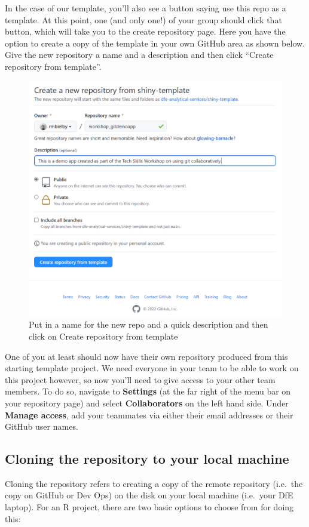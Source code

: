 \documentclass[
  12pt,
]{article}
\begin{document}
In the case of our template, you'll also see a button saying use this
repo as a template. At this point, one (and only one!) of your group
should click that button, which will take you to the create repository
page. Here you have the option to create a copy of the template in your
own GitHub area as shown below. Give the new repository a name and a
description and then click ``Create repository from template''.

\begin{figure}
\includegraphics[width=0.72\linewidth]{images/gitdemo/gitdemo-shinydash-newrepofromtemplate} \caption{Put in a name for the new repo and a quick description and then click on Create repository from template}\label{fig:unnamed-chunk-3}
\end{figure}

One of you at least should now have their own repository produced from
this starting template project. We need everyone in your team to be able
to work on this project however, so now you'll need to give access to
your other team members. To do so, navigate to \textbf{Settings} (at the
far right of the menu bar on your repository page) and select
\textbf{Collaborators} on the left hand side. Under \textbf{Manage
access}, add your teammates via either their email addresses or their
GitHub user names.

\hypertarget{cloning-the-repository-to-your-local-machine}{%
\subsection{Cloning the repository to your local
machine}\label{cloning-the-repository-to-your-local-machine}}

Cloning the repository refers to creating a copy of the remote
repository (i.e.~the copy on GitHub or Dev Ops) on the disk on your
local machine (i.e.~your DfE laptop). For an R project, there are two
basic options to choose from for doing this:
\end{document}
